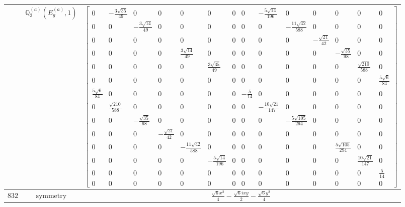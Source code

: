 \documentclass[fleqn,8pt,landscape]{jsarticle}
\begin{document}
\begin{longtable}{ccc}
$  $ & $ \mathbb{Q}_{2}^{(a)}(E_{g}^{(a)},1) $ & $ \begin{bmatrix} 0 & - \frac{3 \sqrt{35}}{49} & 0 & 0 & 0 & 0 & 0 & 0 & - \frac{5 \sqrt{14}}{196} & 0 & 0 & 0 & 0 & 0 \\ 0 & 0 & - \frac{3 \sqrt{14}}{49} & 0 & 0 & 0 & 0 & 0 & 0 & - \frac{11 \sqrt{42}}{588} & 0 & 0 & 0 & 0 \\ 0 & 0 & 0 & 0 & 0 & 0 & 0 & 0 & 0 & 0 & - \frac{\sqrt{21}}{42} & 0 & 0 & 0 \\ 0 & 0 & 0 & 0 & \frac{3 \sqrt{14}}{49} & 0 & 0 & 0 & 0 & 0 & 0 & - \frac{\sqrt{35}}{98} & 0 & 0 \\ 0 & 0 & 0 & 0 & 0 & \frac{3 \sqrt{35}}{49} & 0 & 0 & 0 & 0 & 0 & 0 & \frac{\sqrt{210}}{588} & 0 \\ 0 & 0 & 0 & 0 & 0 & 0 & 0 & 0 & 0 & 0 & 0 & 0 & 0 & \frac{5 \sqrt{6}}{84} \\ \frac{5 \sqrt{6}}{84} & 0 & 0 & 0 & 0 & 0 & 0 & - \frac{5}{14} & 0 & 0 & 0 & 0 & 0 & 0 \\ 0 & \frac{\sqrt{210}}{588} & 0 & 0 & 0 & 0 & 0 & 0 & - \frac{10 \sqrt{21}}{147} & 0 & 0 & 0 & 0 & 0 \\ 0 & 0 & - \frac{\sqrt{35}}{98} & 0 & 0 & 0 & 0 & 0 & 0 & - \frac{5 \sqrt{105}}{294} & 0 & 0 & 0 & 0 \\ 0 & 0 & 0 & - \frac{\sqrt{21}}{42} & 0 & 0 & 0 & 0 & 0 & 0 & 0 & 0 & 0 & 0 \\ 0 & 0 & 0 & 0 & - \frac{11 \sqrt{42}}{588} & 0 & 0 & 0 & 0 & 0 & 0 & \frac{5 \sqrt{105}}{294} & 0 & 0 \\ 0 & 0 & 0 & 0 & 0 & - \frac{5 \sqrt{14}}{196} & 0 & 0 & 0 & 0 & 0 & 0 & \frac{10 \sqrt{21}}{147} & 0 \\ 0 & 0 & 0 & 0 & 0 & 0 & 0 & 0 & 0 & 0 & 0 & 0 & 0 & \frac{5}{14} \\ 0 & 0 & 0 & 0 & 0 & 0 & 0 & 0 & 0 & 0 & 0 & 0 & 0 & 0 \end{bmatrix} $ \\ \hline
$ 832 $ & $ \text{symmetry} $ & $ \frac{\sqrt{6} x^{2}}{4} - \frac{\sqrt{6} i x y}{2} - \frac{\sqrt{6} y^{2}}{4} $ \\

\end{longtable}
\end{document}

